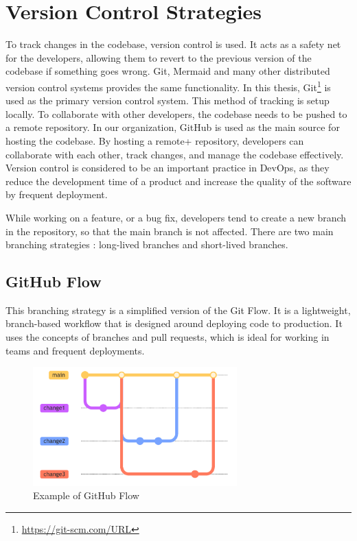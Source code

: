 \section{Version Control Strategies} \label{version_control}
To track changes in the codebase, version control is used. It acts as a safety net for the developers, allowing them to revert to the previous version of the 
codebase if something goes wrong. Git, Mermaid and many other distributed version control systems provides the same functionality. In this thesis, 
Git\footnote{\url{https://git-scm.com/URL}} is used as the primary version control system. This method of tracking is setup locally. To collaborate with other 
developers, the codebase needs to be pushed to a remote repository. In our organization, GitHub is used as the main source for hosting the codebase. By hosting a remote+
repository, developers can collaborate with each other, track changes, and manage the codebase effectively. Version control is considered to be an important
practice in DevOps, as they reduce the development time of a product and increase the quality of the software by frequent deployment.

While working on a feature, or a bug fix, developers tend to create a new branch in the repository, so that the main branch is not affected. There are two main 
branching strategies : long-lived branches and short-lived branches. 
\subsection{GitHub Flow}
This branching strategy is a simplified version of the Git Flow. It is a lightweight, branch-based workflow that is designed around deploying code to production. 
It uses the concepts of branches and pull requests, which is ideal for working in teams and frequent deployments.
\begin{figure}[!ht]
    \centering
    \includegraphics[width=0.7\textwidth]{Images/github_flow.pdf}
    \caption{Example of GitHub Flow}
    \label{github_flow}
\end{figure} 

